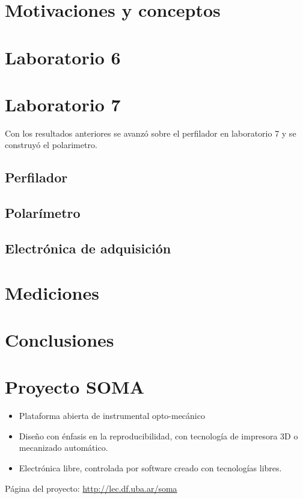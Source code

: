 \documentclass{article}
\begin{document}
    
    \section{Motivaciones y conceptos}
        
        
    \section{Laboratorio 6}
        
    \section{Laboratorio 7}
        Con los resultados anteriores se avanzó sobre el perfilador en laboratorio 7 y se construyó el polarimetro.
        \subsection{Perfilador}
            
        \subsection{Polarímetro}
            
        \subsection{Electrónica de adquisición}
            
    \section{Mediciones}
        
    \section{Conclusiones}
        
        
    \section{Proyecto SOMA}
        \begin{itemize}
            \item Plataforma abierta de instrumental opto-mecánico
            \item Diseño con énfasis en la reproducibilidad, con tecnología de impresora 3D o mecanizado automático.
            \item Electrónica libre, controlada por software creado con tecnologías libres.
        \end{itemize}
        Página del proyecto: \url{http://lec.df.uba.ar/soma}
      
\end{document}
